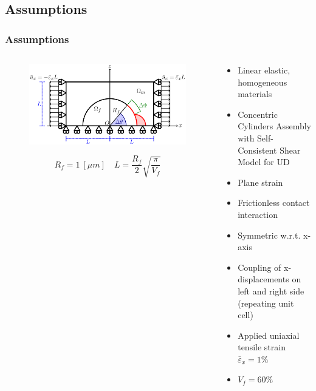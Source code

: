 \documentclass[first,firstsupp,lastsupp,last,hyperref,table]{ETHclass}
\begin{document}
\subsection{Assumptions}

\begin{frame}
\frametitle{\vspace{0.2cm}\small Assumptions}
\vspace{-0.75cm}
\centering
\begin{columns}
\begin{column}{0.5\textwidth}
\begin{figure}
\includegraphics[width=\columnwidth]{RUC.pdf}
\end{figure}
\vspace{-0.1cm}
\tiny
\begin{equation*}
R_{f}=1\ \left[\mu m\right]\quad L=\frac{R_{f}}{2}\sqrt{\frac{\pi}{V_{f}}}
\end{equation*}
\end{column}
\begin{column}{0.5\textwidth}
\scriptsize
\begin{itemize}[label=]
\item Linear elastic, homogeneous materials
\item Concentric Cylinders Assembly with Self-Consistent Shear Model for UD
\item Plane strain
\item Frictionless contact interaction
\item Symmetric w.r.t. x-axis
\item Coupling of x-displacements on left and right side (repeating unit cell)
\item Applied uniaxial tensile strain $\bar{\varepsilon}_{x}=1\%$
\item $V_{f}=60\%$
\end{itemize}
\end{column}

\end{columns}
\end{frame}
\end{document}
